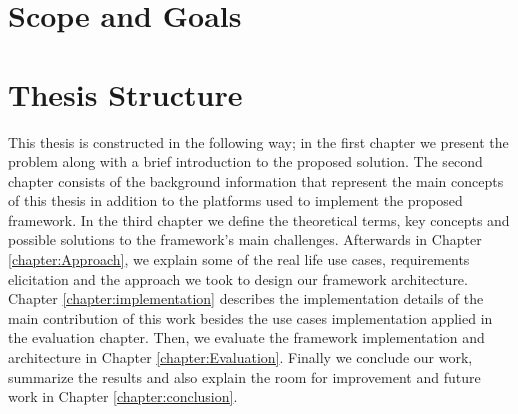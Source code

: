  
\section{Scope and Goals}


\section{Thesis Structure}

This thesis is constructed in the following way; in the first chapter we present the problem along with a brief introduction to the proposed solution. The second chapter consists of the background information  that represent the main concepts of this thesis in addition to the platforms used to implement the proposed framework. In the third chapter we define the theoretical terms, key concepts and possible solutions to the framework's main challenges. Afterwards in Chapter \ref{chapter:Approach}, we explain some of the real life use cases, requirements elicitation and the approach we took to design our framework architecture. Chapter \ref{chapter:implementation} describes the implementation details of the main contribution of this work besides the use cases implementation applied in the evaluation chapter. Then, we evaluate the framework implementation and  architecture in Chapter \ref{chapter:Evaluation}. Finally we conclude our work, summarize the results and also explain the room for improvement and future work in Chapter \ref{chapter:conclusion}.